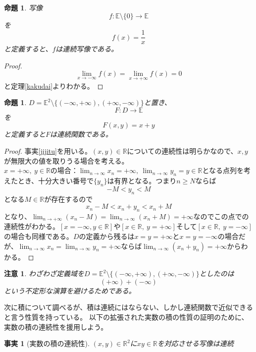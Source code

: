\documentclass[leqno]{jsarticle}
\newtheorem{prop}[thm]{命題}
\newtheorem{fact}[thm]{事実}
\newtheorem*{cau}{注意}
\newcommand{\rr}{\mathbb{R}}
\newcommand{\mgn}{\infty}
\newcommand{\dpst}{\displaystyle}
\newcommand{\rrr}{\mathbb{E}}
\begin{document}
\begin{prop}写像
\[
f:\rrr\setminus \{0\}\to \rrr
\]
を
\[
f(x)=\frac{1}{x}
\]
と定義すると、$f$は連続写像である。
\end{prop}
\begin{proof}
\[
\lim_{x\to -\mgn}f(x)=\lim_{x\to +\mgn}f(x)=0
\]
と定理\ref{kakudai}よりわかる。
\end{proof}



\begin{prop}$D=\rrr^2\setminus \{(-\mgn,+\mgn),(+\mgn,-\mgn)\}$と置き、
\[
F:D\to \rrr
\]を
\[
F(x,y)=x+y
\]
と定義すると$F$は連続関数である。
\end{prop}
\begin{proof}
事実\ref{jijitu}を用いる。$(x,y)\in \rr$についての連続性は明らかなので、$x,y$が無限大の値を取りうる場合を考える。\\ 
$x=+\mgn,\ y\in \rr$の場合：$\dpst \lim_{n\to \mgn}x_n=+\mgn,\ \lim_{n\to\mgn}y_n=y\in\rr$となる点列を考えたとき、十分大きい番号で$\{y_n\}$は有界となる。つまり$n\ge N$ならば
\[
-M<y_n<M
\]
となる$M\in \rr$が存在するので
\[
x_n-M<x_n+y_n<x_n+M
\]
となり、$\dpst \lim_{n\to +\mgn}(x_n-M)=\lim_{n\to \mgn}(x_n+M)=+\mgn$なのでこの点での連続性がわかる。$[x=-\mgn,y\in \rr]$や$[x\in \rr,\ y=+\mgn]$そして$[x\in \rr,\ y=-\mgn]$の場合も同様である。$D$の定義から残るは$x=y=+\mgn$と$x=y=-\mgn$の場合だが、$\dpst \lim_{n\to\mgn}x_n=\lim_{n\to\mgn}y_n=+\mgn$ならば$\lim_{n\to \mgn}(x_n+y_n)=+\mgn$からわかる。
\end{proof}
\begin{cau}
わざわざ定義域を$D=\rrr^2\setminus \{(-\mgn,+\mgn),(+\mgn,-\mgn)\}$としたのは
\[
(+\mgn)+(-\mgn)
\]
という不定形な演算を避けるためである。
\end{cau}

次に積について調べるが、積は連続にはならない、しかし連続関数で近似できると言う性質を持っている。
以下の拡張された実数の積の性質の証明のために、実数の積の連続性を援用しよう。
\begin{fact}[実数の積の連続性]\label{kakezan}
$(x,y)\in \rr^2$に$xy\in \rr$を対応させる写像は連続
\end{fact}
\end{document}

